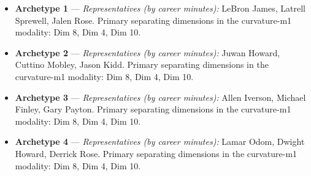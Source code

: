 \begin{itemize}
\item \textbf{Archetype 1} --- \emph{Representatives (by career minutes):} LeBron James, Latrell Sprewell, Jalen Rose. Primary separating dimensions in the curvature-m1 modality: Dim 8, Dim 4, Dim 10.
\item \textbf{Archetype 2} --- \emph{Representatives (by career minutes):} Juwan Howard, Cuttino Mobley, Jason Kidd. Primary separating dimensions in the curvature-m1 modality: Dim 8, Dim 4, Dim 10.
\item \textbf{Archetype 3} --- \emph{Representatives (by career minutes):} Allen Iverson, Michael Finley, Gary Payton. Primary separating dimensions in the curvature-m1 modality: Dim 8, Dim 4, Dim 10.
\item \textbf{Archetype 4} --- \emph{Representatives (by career minutes):} Lamar Odom, Dwight Howard, Derrick Rose. Primary separating dimensions in the curvature-m1 modality: Dim 8, Dim 4, Dim 10.
\end{itemize}
